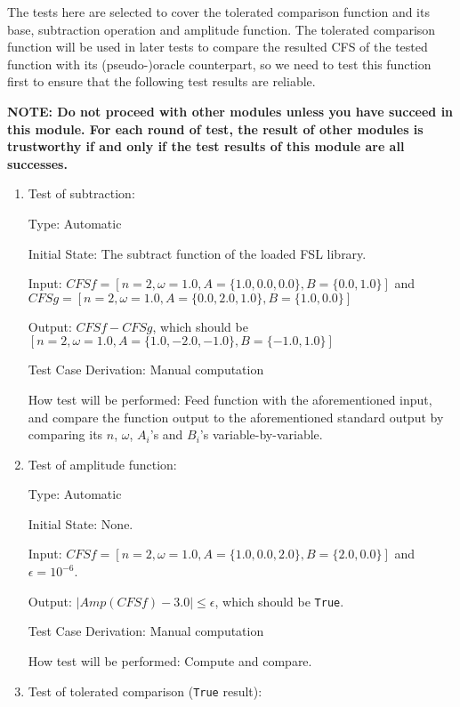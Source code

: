 \documentclass[12pt, titlepage]{article}
\newcommand{\li}[1]{\texttt{#1}}
\begin{document}
The tests here are selected to cover the tolerated comparison function and its base, subtraction operation and amplitude function. The tolerated comparison function will be used in later tests to compare the resulted CFS of the tested function with its (pseudo-)oracle counterpart, so we need to test this function first to ensure that the following test results are reliable.

\textbf{NOTE: Do not proceed with other modules unless you have succeed in this module. For each round of test, the result of other modules is trustworthy if and only if the test results of this module are all successes.}

\begin{enumerate}
	
	\item{Test of subtraction: \\}
	
	Type: Automatic
	
	Initial State: The subtract function of the loaded FSL library.
	
	Input: $\mathit{CFSf}=[n=2, \omega=1.0, A=\{1.0, 0.0, 0.0\}, B=\{0.0, 1.0\}]$ and 
	$\mathit{CFSg}=[n=2, \omega=1.0, A=\{0.0, 2.0, 1.0\}, B=\{1.0, 0.0\}]$	 
	
	Output: $\mathit{CFSf}-\mathit{CFSg}$, which should be $[n=2, \omega=1.0, A=\{1.0, -2.0, -1.0\}, B=\{-1.0, 1.0\}]$
	
	Test Case Derivation: Manual computation
	
	How test will be performed: Feed function with the aforementioned input, and compare the function output to the aforementioned standard output by comparing its $n$, $\omega$, $A_i$'s and $B_i$'s variable-by-variable.
	
	\item{Test of amplitude function: \\}					
	
	Type: Automatic
	
	Initial State: None.
	
	Input: $\mathit{CFSf}=[n=2, \omega=1.0, A=\{1.0, 0.0, 2.0\}, B=\{2.0, 0.0\}]$ and $\epsilon=10^{-6}$.
	
	Output: $|\mathit{Amp}(\mathit{CFSf})-3.0|\leq\epsilon$, which should be \li{True}.
	
	Test Case Derivation: Manual computation
	
	How test will be performed: Compute and compare.
	
	
	\item{Test of tolerated comparison  (\li{True} result): \\}
	

\end{enumerate}
\end{document}
